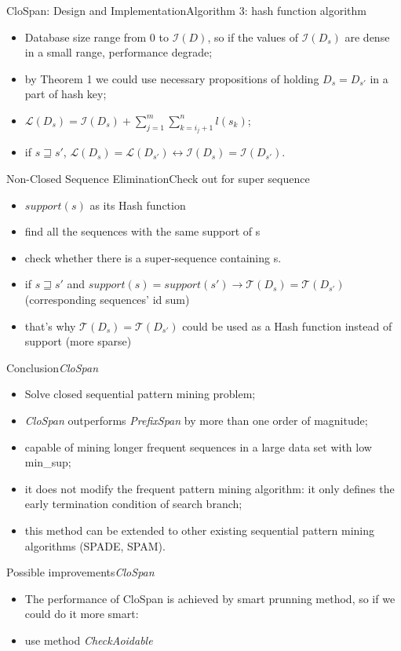 \documentclass[12pt]{beamer}
\begin{document}
\begin{frame}{CloSpan: Design and Implementation}{Algorithm 3: hash function algorithm}
\begin{itemize}
\item Database size range from 0 to $\mathcal{I}(D)$, so if the values of $\mathcal{I}(D_s)$ are dense in a small range, performance degrade;
\item by Theorem 1 we could use necessary propositions of holding $D_s = D_{s'}$ in a part of hash key;
\item $\mathcal{L}(D_s) = \mathcal{I}(D_s) + \sum^{m}_{j=1} \sum^{n}_{k=i_j+1}l(s_k)$;
\item if $s \sqsupseteq s'$, $\mathcal{L}(D_s) = \mathcal{L}(D_{s'}) \leftrightarrow \mathcal{I}(D_s) = \mathcal{I}(D_{s'})$.
\end{itemize}
\end{frame}

\begin{frame}{Non-Closed Sequence Elimination}{Check out for super sequence}
\begin{itemize}
\item $support(s)$ as its Hash function 
\item find all the sequences with the same support of s
\item check whether there is a super-sequence containing s.
\item if $s \sqsupseteq s'$ and $support(s) = support(s') \rightarrow \mathcal{T}(D_s) = \mathcal{T}(D_{s'})$ (corresponding sequences' id sum)
\item that's why $\mathcal{T}(D_s) = \mathcal{T}(D_{s'})$ could be used as a Hash function instead of support (more sparse)
\end{itemize}
\end{frame}

\begin{frame}{Conclusion}{{\it CloSpan}}
\begin{itemize}
\item Solve closed sequential pattern mining problem;
\item {\it CloSpan} outperforms {\it PrefixSpan} by more than one order of magnitude;
\item capable of mining longer frequent sequences in a large data set with low min\_sup;
\item it does not modify the frequent pattern mining algorithm: it only defines the early termination condition of search branch;
\item this method can be extended to other existing sequential pattern mining algorithms (SPADE, SPAM).
\end{itemize}
\end{frame}

\begin{frame}{Possible improvements}{{\it CloSpan}}
\begin{itemize}
\item The performance of CloSpan is achieved by smart prunning method, so if we could do it more smart:
\item use method {\it CheckAoidable}
\end{itemize}
\end{frame}
\end{document}
